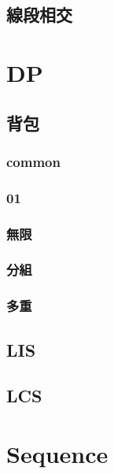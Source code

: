 \subsection{線段相交}


\section{DP}

\subsection{背包}

\subsubsection{common}


\subsubsection{01}


\subsubsection{無限}


\subsubsection{分組}


\subsubsection{多重}


\subsection{LIS}


\subsection{LCS}


\section{Sequence}

